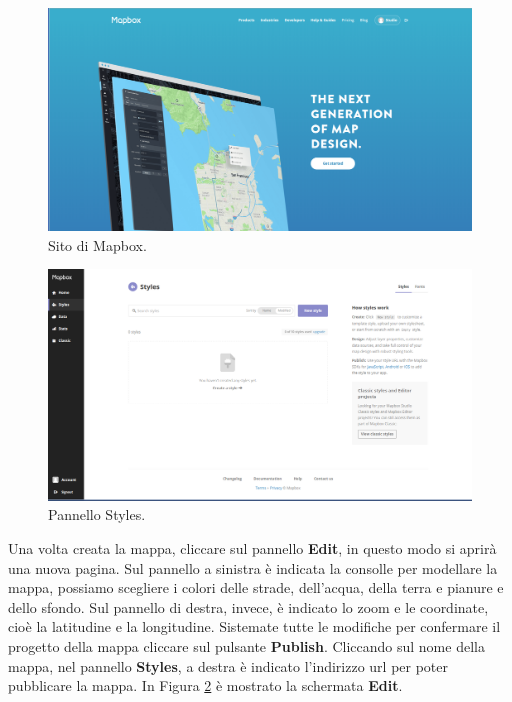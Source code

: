 \documentclass[a4paper,11pt]{article}
\begin{document}
\newpage
\begin{figure}[htpb]
	\centering
	\includegraphics[scale=0.25]{Mapbox.png}
	\caption{Sito di Mapbox.}
	\label{fig:5}
\end{figure}
\begin{figure}[htpb]
	\centering
	\includegraphics[scale=0.26]{Styles.png}
	\caption{Pannello Styles.}
	\label{fig:6}
\end{figure}
Una volta creata la mappa, cliccare sul pannello \textbf{Edit}, in questo modo si aprirà una nuova pagina.
Sul pannello  a sinistra è indicata la consolle per modellare la mappa, possiamo scegliere i colori delle strade, dell'acqua, della terra e pianure e dello sfondo.\newline
Sul pannello di destra, invece, è indicato lo zoom e le coordinate, cioè la latitudine e la longitudine. Sistemate tutte le modifiche per confermare il progetto della mappa cliccare sul pulsante \textbf{Publish}.
Cliccando sul nome della mappa, nel pannello \textbf{Styles}, a destra è indicato l'indirizzo url per poter pubblicare la mappa.
In Figura \ref{fig:6} è mostrato la schermata \textbf{Edit}.
\end{document}

